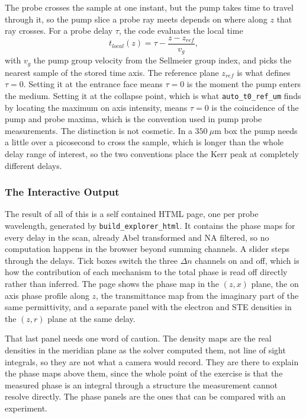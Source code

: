 The probe crosses the sample at one instant, but the pump takes time to travel through it, so the pump slice a probe ray meets depends on where along $z$ that ray crosses. For a probe delay $\tau$, the code evaluates the local time
\begin{equation}
t_{local}(z) = \tau - \frac{z-z_{ref}}{v_g},
\end{equation}
with $v_g$ the pump group velocity from the Sellmeier group index, and picks the nearest sample of the stored time axis. The reference plane $z_{ref}$ is what defines $\tau=0$. Setting it at the entrance face means $\tau=0$ is the moment the pump enters the medium. Setting it at the collapse point, which is what \texttt{auto\_t0\_ref\_um} finds by locating the maximum on axis intensity, means $\tau=0$ is the coincidence of the pump and probe maxima, which is the convention used in pump probe measurements. The distinction is not cosmetic. In a $350\ \mu\text{m}$ box the pump needs a little over a picosecond to cross the sample, which is longer than the whole delay range of interest, so the two conventions place the Kerr peak at completely different delays.

\subsubsection{The Interactive Output}

The result of all of this is a self contained HTML page, one per probe wavelength, generated by \texttt{build\_explorer\_html}. It contains the phase maps for every delay in the scan, already Abel transformed and NA filtered, so no computation happens in the browser beyond summing channels. A slider steps through the delays. Tick boxes switch the three $\Delta n$ channels on and off, which is how the contribution of each mechanism to the total phase is read off directly rather than inferred. The page shows the phase map in the $(z,x)$ plane, the on axis phase profile along $z$, the transmittance map from the imaginary part of the same permittivity, and a separate panel with the electron and STE densities in the $(z,r)$ plane at the same delay.

That last panel needs one word of caution. The density maps are the real densities in the meridian plane as the solver computed them, not line of sight integrals, so they are not what a camera would record. They are there to explain the phase maps above them, since the whole point of the exercise is that the measured phase is an integral through a structure the measurement cannot resolve directly. The phase panels are the ones that can be compared with an experiment.


